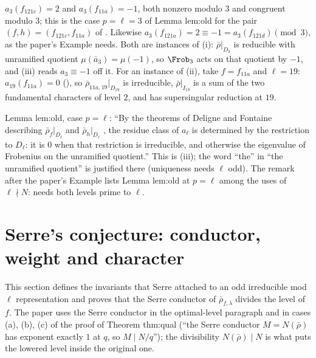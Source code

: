 \begin{example}\label{ex:modgalrep:deligne-fontaine}
$a_3(f_{121c})=2$ and $a_3(f_{11a})=-1$, both nonzero modulo $3$ and congruent modulo $3$; this is the case $p=\ell=3$ of Lemma lem:old for the pair
$(f,h)=(f_{121c},f_{11a})$ of . Likewise $a_3(f_{121a})=2\equiv-1=a_3(f_{121d})\pmod3$, as the paper's Example needs.
Both are instances of (i): $\bar\rho|_{D_3}$ is reducible with unramified quotient $\mu(\bar a_3)=\mu(-1)$, so $\Frob_3$ acts on that quotient by $-1$, and (iii) reads $a_3\equiv-1$ off it.
For an instance of (ii), take $f=f_{11a}$ and $\ell=19$: $a_{19}(f_{11a})=0$ (), so $\bar\rho_{11a,19}|_{D_{19}}$ is irreducible, $\bar\rho|_{I_{19}}$ is a sum of the two
fundamental characters of level $2$, and  has supersingular reduction at $19$.
\end{example}

\begin{paperlink}
Lemma lem:old, case $p=\ell$: ``By the theorems of Deligne and Fontaine describing $\bar\rho_f|_{D_\ell}$ and $\bar\rho_h|_{D_\ell}$ \cite[\S2]{Edixhoven92}, the residue
class of $a_\ell$ is determined by the restriction to $D_\ell$: it is $0$ when that restriction is irreducible, and otherwise the eigenvalue of Frobenius on
the unramified quotient.'' This is (iii); the word ``the'' in ``the unramified quotient'' is justified there (uniqueness
needs $\ell$ odd). The remark after the paper's Example lists Lemma lem:old at $p=\ell$ among the uses of $\ell\nmid N$: 
needs both levels prime to $\ell$.
\end{paperlink}

\section[Serre's conjecture]{Serre's conjecture: conductor, weight and character}\label{sec:modgalrep:serre}

This section defines the invariants that Serre attached to an odd irreducible mod $\ell$ representation and proves that the Serre conductor of
$\bar\rho_{f,\lambda}$ divides the level of $f$. The paper uses the Serre conductor in the optimal-level paragraph and in cases (a), (b), (c) of the proof
of Theorem thm:qual (``the Serre conductor $M=N(\bar\rho)$ has exponent exactly $1$ at $q$, so $M\mid N/q$''); the divisibility $N(\bar\rho)\mid N$ is what puts the
lowered level inside the original one.

